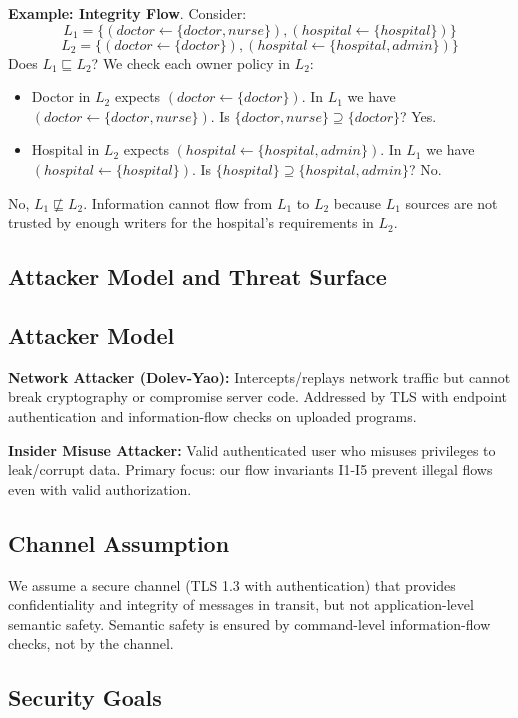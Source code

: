 \textbf{Example: Integrity Flow}.
Consider:
\[
L_1 = \{(doctor \leftarrow \{doctor,nurse\}), (hospital \leftarrow \{hospital\})\}
\]
\[
L_2 = \{(doctor \leftarrow \{doctor\}), (hospital \leftarrow \{hospital,admin\})\}
\]
Does $L_1 \sqsubseteq L_2$? We check each owner policy in $L_2$:
\begin{itemize}
  \item Doctor in $L_2$ expects $(doctor \leftarrow \{doctor\})$. In $L_1$ we have $(doctor \leftarrow \{doctor,nurse\})$. Is $\{doctor,nurse\} \supseteq \{doctor\}$? Yes. \checkmark
  \item Hospital in $L_2$ expects $(hospital \leftarrow \{hospital,admin\})$. In $L_1$ we have $(hospital \leftarrow \{hospital\})$. Is $\{hospital\} \supseteq \{hospital,admin\}$? No. \times
\end{itemize}
No, $L_1 \not\sqsubseteq L_2$. Information cannot flow from $L_1$ to $L_2$ because $L_1$ sources are not trusted by enough writers for the hospital's requirements in $L_2$.

\subsection{Attacker Model and Threat Surface}

\subsection{Attacker Model}

\textbf{Network Attacker (Dolev-Yao):} Intercepts/replays network traffic but cannot break cryptography or compromise server code. Addressed by TLS with endpoint authentication and information-flow checks on uploaded programs.

\textbf{Insider Misuse Attacker:} Valid authenticated user who misuses privileges to leak/corrupt data. Primary focus: our flow invariants I1-I5 prevent illegal flows even with valid authorization.

\subsection{Channel Assumption}

We assume a secure channel (TLS 1.3 with authentication) that provides confidentiality and integrity of messages in transit, but not application-level semantic safety. Semantic safety is ensured by command-level information-flow checks, not by the channel.

\subsection{Security Goals}

